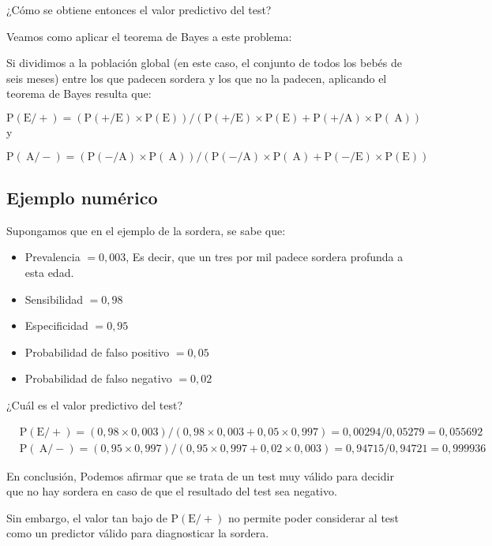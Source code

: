 \documentclass[
  a4paper,
  DIV=11,
  numbers=noendperiod]{scrreprt}
\begin{document}
¿Cómo se obtiene entonces el valor predictivo del test?

Veamos como aplicar el teorema de Bayes a este problema:

Si dividimos a la población global (en este caso, el conjunto de todos
los bebés de seis meses) entre los que padecen sordera y los que no la
padecen, aplicando el teorema de Bayes resulta que:

\[
\mathrm{P}(\mathrm{E} /+)=(\mathrm{P}(+/ \mathrm{E}) \times \mathrm{P}(\mathrm{E})) /(\mathrm{P}(+/ \mathrm{E}) \times \mathrm{P}(\mathrm{E})+\mathrm{P}(+/ \mathrm{A}) \times \mathrm{P}(\mathrm{~A}))
\] y

\[
\mathrm{P}(\mathrm{~A} /-)=(\mathrm{P}(-/ \mathrm{A}) \times \mathrm{P}(\mathrm{~A})) /(\mathrm{P}(-/ \mathrm{A}) \times \mathrm{P}(\mathrm{~A})+\mathrm{P}(-/ \mathrm{E}) \times \mathrm{P}(\mathrm{E}))
\]

\subsection{Ejemplo numérico}\label{ejemplo-numuxe9rico}

Supongamos que en el ejemplo de la sordera, se sabe que:

\begin{itemize}
\item
  Prevalencia \(=0,003\), Es decir, que un tres por mil padece sordera
  profunda a esta edad.
\item
  Sensibilidad \(=0,98\)
\item
  Especificidad \(=0,95\)
\item
  Probabilidad de falso positivo \(=0,05\)
\item
  Probabilidad de falso negativo \(=0,02\)
\end{itemize}

¿Cuál es el valor predictivo del test?

\[
\begin{aligned}
& \mathrm{P}(\mathrm{E} /+)=(0,98 \times 0,003) /(0,98 \times 0,003+0,05 \times 0,997)=0,00294 / 0,05279=0,055692 \\
& \mathrm{P}(\mathrm{~A} /-)=(0,95 \times 0,997) /(0,95 \times 0,997+0,02 \times 0,003)=0,94715 / 0,94721=0,999936
\end{aligned}
\]

En conclusión, Podemos afirmar que se trata de un test muy válido para
decidir que no hay sordera en caso de que el resultado del test sea
negativo.

Sin embargo, el valor tan bajo de \(\mathrm{P}(\mathrm{E} /+)\) no
permite poder considerar al test como un predictor válido para
diagnosticar la sordera.
\end{document}

